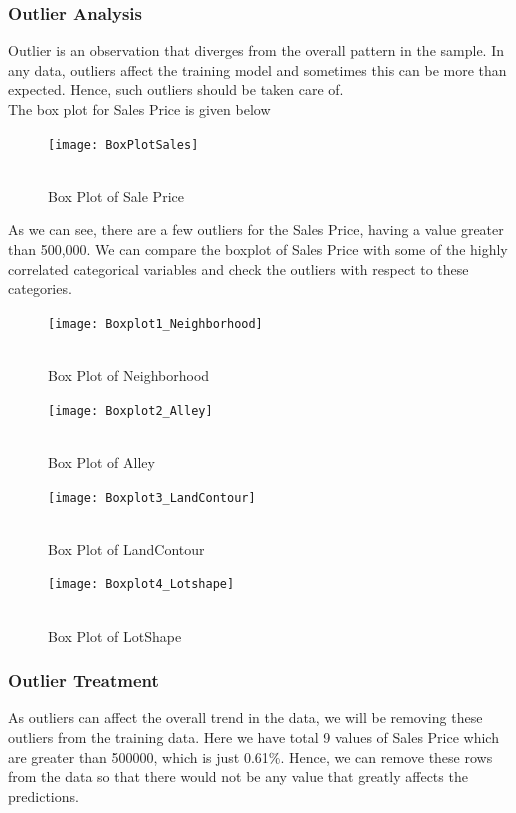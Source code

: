 \documentclass[fleqn,10pt]{SelfArx} %
\begin{document}
\subsubsection{Outlier Analysis}
Outlier is an observation that diverges from the overall pattern in the sample. In any data, outliers affect the training model and sometimes this can be more than expected. Hence, such outliers should be taken care of.
\\The box plot for Sales Price is given below
\begin{figure}[h]\centering
\texttt{[image: BoxPlotSales]}
\\ \caption{\\ Box Plot of Sale Price}
\end{figure}
As we can see, there are a few outliers for the Sales Price, having a value greater than 500,000.
We can compare the boxplot of Sales Price with some of the highly correlated categorical variables and check the outliers with respect to these categories.
\begin{figure}[h!]\centering
\texttt{[image: Boxplot1\_Neighborhood]}
\\ \caption{\\ Box Plot of Neighborhood}
\end{figure}

\begin{figure}[h!]\centering
\texttt{[image: Boxplot2\_Alley]}
\\ \caption{\\ Box Plot of Alley}
\end{figure}

\begin{figure}[h!]\centering
\texttt{[image: Boxplot3\_LandContour]}
\\ \caption{\\ Box Plot of LandContour}
\end{figure}

\begin{figure}[h!]\centering
\texttt{[image: Boxplot4\_Lotshape]}
\\ \caption{\\ Box Plot of LotShape}
\end{figure}

\subsubsection{Outlier Treatment}
As outliers can affect the overall trend in the data, we will be removing these outliers from the training data. Here we have total 9 values of Sales Price which are greater than 500000, which is just 0.61\%. Hence, we can remove these rows from the data so that there would not be any value that greatly affects the predictions.
\end{document}

